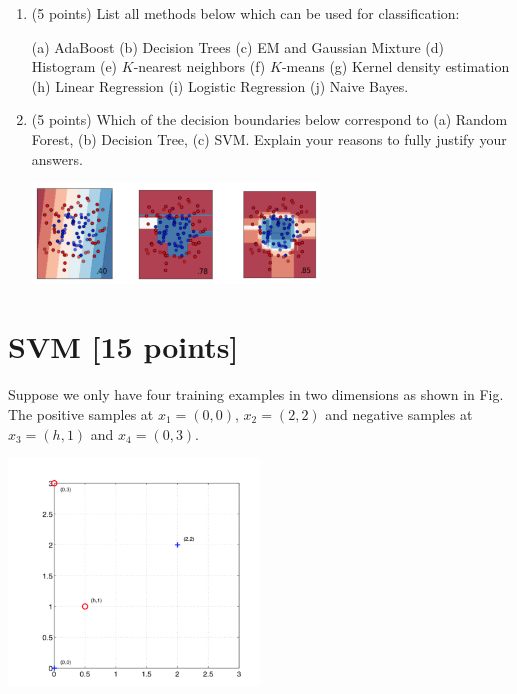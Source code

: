 \documentclass[a4paper,12pt,fleqn]{article}
\begin{document}
\begin{enumerate}
\item (5 points) List all methods below which can be used for classification:

(a) AdaBoost (b) Decision Trees (c) EM and Gaussian Mixture (d) Histogram (e) $K$-nearest neighbors (f) $K$-means (g) Kernel density estimation 
(h) Linear Regression (i) Logistic Regression (j) Naive Bayes. 



\vspace{1.3in}

\item (5 points) Which of the decision boundaries below correspond to (a) Random Forest, (b) Decision Tree, (c) SVM. Explain your reasons  to fully justify your answers. 
%
\begin{center}
\includegraphics[width = 0.6\textwidth]{./fig/decision}
\end{center}

%

\end{enumerate}


\clearpage
\section{SVM [15 points]}

Suppose we only have four training examples in two dimensions as shown in Fig. The positive samples at $x_1 = (0, 0)$, $x_2 = (2, 2)$ and negative samples at $x_3 = (h, 1)$ and $x_4 = (0, 3)$. 
%
\begin{center}
\includegraphics[width = 0.5\textwidth]{./fig/svm}
\end{center}
\end{document}
